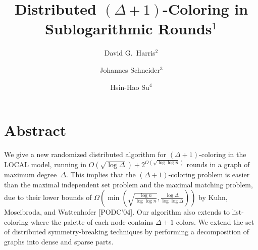 \documentclass[11pt]{amsart}
\begin{document}
\author[David G. Harris and Johannes Schneider and Hsin-Hao Su]{
{\sc David G.~Harris}$^{2}$
\and
{\sc Johannes Schneider}$^{3}$
\and
{\sc Hsin-Hao Su}$^{4}$
}

\setcounter{footnote}{0}


\addtocounter{footnote}{1}

\addtocounter{footnote}{1}

\addtocounter{footnote}{1}

\addtocounter{footnote}{1}

\title{Distributed $(\Delta+1)$-Coloring in Sublogarithmic Rounds$^{1}$}



\maketitle
\section*{Abstract} \label{sec:Abstract}
\noindent
 We give a new randomized distributed algorithm for $(\Delta+1)$-coloring in the LOCAL model, running in $O(\sqrt{\log \Delta})+ 2^{O(\sqrt{\log \log n})}$ rounds in a graph of maximum degree~$\Delta$. This implies that the $(\Delta+1)$-coloring problem is easier than the maximal independent set problem and the maximal matching problem, due to their lower bounds of $\Omega \left( \min \left( \sqrt{\frac{\log n}{\log \log n}}, \frac{\log \Delta}{\log \log \Delta}  \right)  \right)$ by Kuhn, Moscibroda, and Wattenhofer [PODC'04]. Our algorithm also extends to list-coloring where the palette of each node contains $\Delta+1$ colors. We extend the set of distributed symmetry-breaking techniques by performing a decomposition of graphs into dense and sparse parts.
\end{document}
